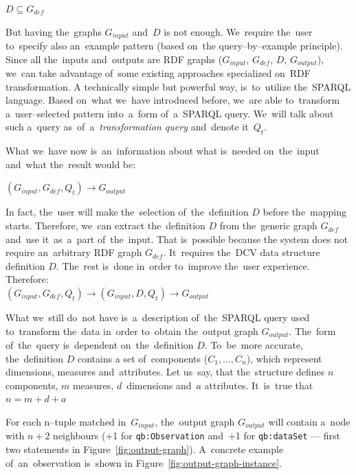 {\centering $D \subseteq G_{def}$ \\[0.5cm]}

But having the~graphs $G_{input}$ and~$D$ 
is not enough. We~require the~user to~specify also an~example pattern (based on~the
query--by--example principle). Since all the~inputs and~outputs are RDF
graphs ($G_{input}$, $G_{def}$, $D$, $G_{output}$), we~can take 
advantage of~some existing approaches specialized on~RDF transformation. 
A technically simple but powerful way, is~to~utilize the~SPARQL language. Based on~what we~have introduced before, we~are able to~transform a~user--selected pattern into~a~form of~a~SPARQL
query. We~will talk about such a~query as~of~a~\emph{transformation query} and~denote it~$Q_t$.

What we~have now is~an~information about what is~needed on~the~input and~what the~result would be:

{\centering $(G_{input}, G_{def}, Q_t) \rightarrow G_{output}$ \\[0.5cm]}

In fact, the~user will make the~selection of~the~definition $D$ before the~mapping starts. Therefore, we~can extract the~definition $D$ from the~generic graph $G_{def}$ and~use it~as~a~part of~the~input. That is~possible because 
the system does not require an~arbitrary RDF graph $G_{def}$. It~requires the~DCV 
data structure definition $D$. The~rest is~done in~order to~improve the~user 
experience. Therefore:\\

{\centering $(G_{input}, G_{def}, Q_t) \rightarrow (G_{input}, D, Q_t) \rightarrow G_{output}$  \\[0.5cm]}

What we~still do~not have is~a~description of~the~SPARQL query used to~transform the~data in~order to~obtain the~output graph $G_{output}$. The~form of~the~query is~dependent on~the~definition $D$. To~be~more accurate, the~definition $D$ contains
a set of~components ($C_1, ... , C_n$), which represent dimensions, measures and~attributes.
Let us~say, that the~structure defines $n$ components, $m$ measures, $d$~dimensions and~$a$ 
attributes. It~is~true that\\

{\centering $n = m+d+a$ \\[0.5cm]}

For each n--tuple matched in~$G_{input}$, the~output graph $G_{output}$ will contain a~node with $n+2$ 
neighbours (+1 for \verb|qb:Observation| and~+1 for \verb|qb:dataSet| --- first two statements
in Figure~\ref{fig:output-graph}). A~concrete example of~an~observation is~shown 
in Figure~\ref{fig:output-graph-instance}.

